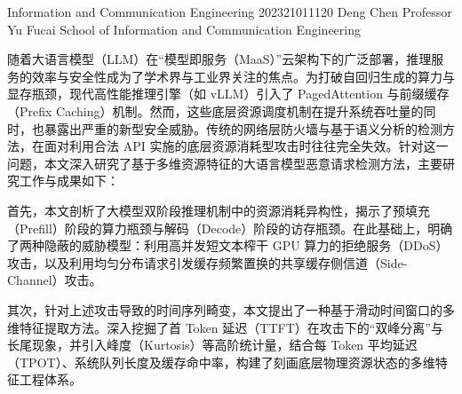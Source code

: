 \documentclass[master, vlined]{DissertUESTC}
\begin{document}

	

					{Information and Communication Engineering}
					{202321011120}
					{Deng Chen}
					{Professor Yu Fucai}{}
					{School of Information and Communication Engineering}
	
	\declaration{}{}{}  %
	


	
	
	\zhabstract
	
	随着大语言模型（LLM）在“模型即服务（MaaS）”云架构下的广泛部署，推理服务的效率与安全性成为了学术界与工业界关注的焦点。为打破自回归生成的算力与显存瓶颈，现代高性能推理引擎（如 vLLM）引入了 PagedAttention 与前缀缓存（Prefix Caching）机制。然而，这些底层资源调度机制在提升系统吞吐量的同时，也暴露出严重的新型安全威胁。传统的网络层防火墙与基于语义分析的检测方法，在面对利用合法 API 实施的底层资源消耗型攻击时往往完全失效。针对这一问题，本文深入研究了基于多维资源特征的大语言模型恶意请求检测方法，主要研究工作与成果如下：

	首先，本文剖析了大模型双阶段推理机制中的资源消耗异构性，揭示了预填充（Prefill）阶段的算力瓶颈与解码（Decode）阶段的访存瓶颈。在此基础上，明确了两种隐蔽的威胁模型：利用高并发短文本榨干 GPU 算力的拒绝服务（DDoS）攻击，以及利用均匀分布请求引发缓存频繁置换的共享缓存侧信道（Side-Channel）攻击。

	其次，针对上述攻击导致的时间序列畸变，本文提出了一种基于滑动时间窗口的多维特征提取方法。深入挖掘了首 Token 延迟（TTFT）在攻击下的“双峰分离”与长尾现象，并引入峰度（Kurtosis）等高阶统计量，结合每 Token 平均延迟（TPOT）、系统队列长度及缓存命中率，构建了刻画底层物理资源状态的多维特征工程体系。
\end{document}
